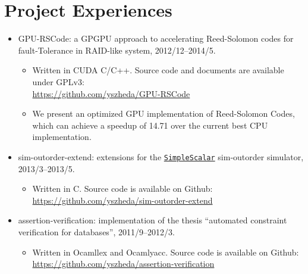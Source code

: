 \documentclass[letterpaper]{article}
\begin{document}
\section*{Project Experiences}
\begin{itemize}
  \item GPU-RSCode: a GPGPU approach to accelerating Reed-Solomon codes for fault-Tolerance in RAID-like system, 2012/12--2014/5.
	\begin{itemize}
	  \item Written in CUDA C/C++. Source code and documents are available under GPLv3: \\ \url{https://github.com/yszheda/GPU-RSCode}
      \item We present an optimized GPU implementation of Reed-Solomon Codes, which can achieve a speedup of 14.71 over the current best CPU implementation.
	\end{itemize}
  \item sim-outorder-extend: extensions for the \href{http://www.simplescalar.com/}{\tt SimpleScalar} sim-outorder simulator, 2013/3--2013/5.
  \begin{itemize}
    \item Written in C. Source code is available on Github: \url{https://github.com/yszheda/sim-outorder-extend}
  \end{itemize}
  \item assertion-verification: implementation of the thesis ``automated constraint verification for databases'', 2011/9--2012/3.
	\begin{itemize}
	  \item Written in Ocamllex and Ocamlyacc. Source code is available on Github: \\ \url{https://github.com/yszheda/assertion-verification}
	\end{itemize}

\end{itemize}
\end{document}
